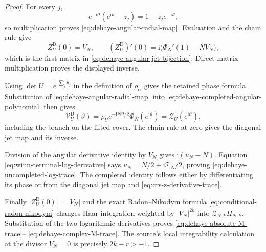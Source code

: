 \begin{proof}
For every $j$,
\[
 e^{-\mathrm i\vartheta}(e^{\mathrm i\vartheta}-z_j)
 =1-z_je^{-\mathrm i\vartheta},
\]
so multiplication proves \eqref{eq:dehaye-angular-radial-map}.  Evaluation and the
chain rule give
\[
 Z_U^{\mathrm D}(0)=V_N,\qquad
 (Z_U^{\mathrm D})'(0)=\mathrm i\bigl(\Phi_N'(1)-NV_N\bigr),
\]
which is the first matrix in \eqref{eq:dehaye-angular-jet-bijection}.  Direct matrix
multiplication proves the displayed inverse.

Using $\det U=e^{\mathrm i\sum_j\theta_j}$ in the definition of $\rho_U$ gives
the retained phase formula.  Substitution of
\eqref{eq:dehaye-angular-radial-map} into
\eqref{eq:dehaye-completed-angular-polynomial} then gives
\[
 \mathcal V_U^{\mathrm D}(\vartheta)
 =\rho_Ue^{-\mathrm iN\vartheta/2}\Phi_N(e^{\mathrm i\vartheta})
 =\mathcal Z_U(e^{\mathrm i\vartheta}),
\]
including the branch on the lifted cover.  The chain rule at zero gives the diagonal
jet map and its inverse.

Division of the angular derivative identity by $V_N$ gives
$\mathrm i(u_N-N)$.  Equation \eqref{eq:winn-terminal-log-derivative} says
$u_N=N/2+\mathrm i\mathcal T_N/2$, proving
\eqref{eq:dehaye-uncompleted-log-trace}.  The completed identity follows either by
differentiating its phase or from the diagonal jet map and
\eqref{eq:crs-z-derivative-trace}.

Finally $|Z_U^{\mathrm D}(0)|=|V_N|$ and the exact Radon--Nikodym formula
\eqref{eq:conditional-radon-nikodym} changes Haar integration weighted by
$|V_N|^{2k}$ into $\mathcal Z_{N,k}\Pi_{N,k}$.  Substitution of the two logarithmic
derivatives proves \eqref{eq:dehaye-absolute-M-trace}--
\eqref{eq:dehaye-complex-M-trace}.  The source's local integrability calculation at
the divisor $V_N=0$ is precisely $2k-r>-1$.
\end{proof}

